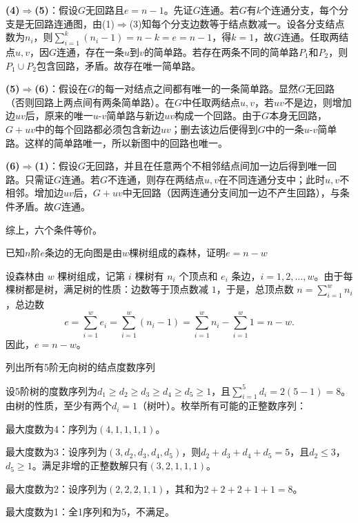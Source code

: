 \documentclass[lang=cn,11pt]{elegantbook}
\begin{document}
\textbf{(4)$\Rightarrow$(5)}：假设$G$无回路且$e=n-1$。先证$G$连通。若$G$有$k$个连通分支，每个分支是无回路连通图，由(1)$\Rightarrow$(3)知每个分支边数等于结点数减一。设各分支结点数为$n_i$，则$\sum_{i=1}^k (n_i-1)=n-k=e=n-1$，得$k=1$，故$G$连通。任取两结点$u,v$，因$G$连通，存在一条$u$到$v$的简单路。若存在两条不同的简单路$P_1$和$P_2$，则$P_1\cup P_2$包含回路，矛盾。故存在唯一简单路。

\textbf{(5)$\Rightarrow$(6)}：假设在$G$的每一对结点之间都有唯一的一条简单路。显然$G$无回路（否则回路上两点间有两条简单路）。在$G$中任取两结点$u,v$，若$uv$不是边，则增加边$uv$后，原来的唯一$u$-$v$简单路与新边$uv$构成一个回路。由于$G$本身无回路，$G+uv$中的每个回路都必须包含新边$uv$；删去该边后便得到$G$中的一条$u$-$v$简单路。这样的简单路唯一，所以新图中的回路也唯一。

\textbf{(6)$\Rightarrow$(1)}：假设$G$无回路，并且在任意两个不相邻结点间加一边后得到唯一回路。只需证$G$连通。若$G$不连通，则存在两结点$u,v$在不同连通分支中；此时$u,v$不相邻。增加边$uv$后，$G+uv$中无回路（因两连通分支间加一边不产生回路），与条件矛盾。故$G$连通。

综上，六个条件等价。
\begin{example}
    已知$n$阶$e$条边的无向图是由$w$棵树组成的森林，证明$e=n-w$
\end{example}
设森林由 $w$ 棵树组成，记第 $i$ 棵树有 $n_i$ 个顶点和 $e_i$ 条边，$i=1,2,\dots,w$。由于每棵树都是树，满足树的性质：边数等于顶点数减 $1$，于是，总顶点数 $n = \sum_{i=1}^w n_i$，总边数
    \[
    e = \sum_{i=1}^w e_i = \sum_{i=1}^w (n_i - 1) = \sum_{i=1}^w n_i - \sum_{i=1}^w 1 = n - w.
    \]
    因此，$e = n - w$。
\begin{example}
列出所有5阶无向树的结点度数序列
\end{example}
设5阶树的度数序列为$d_1 \ge d_2 \ge d_3 \ge d_4 \ge d_5 \ge 1$，且$\displaystyle\sum_{i=1}^5 d_i = 2(5-1) = 8$。由树的性质，至少有两个$d_i = 1$（树叶）。枚举所有可能的正整数序列：

最大度数为4：序列为$(4,1,1,1,1)$。
 
最大度数为3：设序列为$(3, d_2, d_3, d_4, d_5)$，则$d_2 + d_3 + d_4 + d_5 = 5$，且$d_2 \le 3$，$d_5 \ge 1$。满足非增的正整数解只有$(3,2,1,1,1)$。

最大度数为2：设序列为$(2,2,2,1,1)$，其和为$2+2+2+1+1=8$。

最大度数为1：全1序列和为5，不满足。
\end{document}

